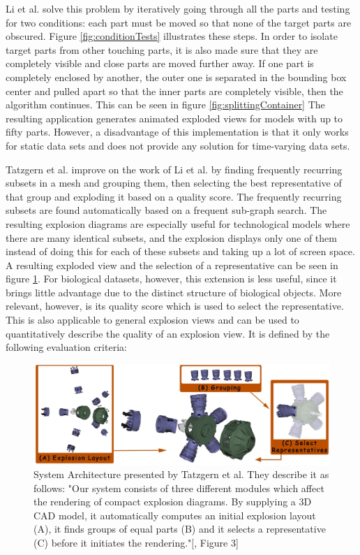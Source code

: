 Li et al. solve this problem by iteratively going through all the parts and testing for two conditions: each part must be moved so that none of the target parts are obscured. Figure \ref{fig:conditionTests} illustrates these steps.
In order to isolate target parts from other touching parts, it is also made sure that they are completely visible and close parts are moved further away. 
If one part is completely enclosed by another, the outer one is separated in the bounding box center and pulled apart so that the inner parts are completely visible, then the algorithm continues. This can be seen in figure \ref{fig:splittingContainer}
The resulting application generates animated exploded views for models with up to fifty parts. 
However, a disadvantage of this implementation is that it only works for static data sets and does not provide any solution for time-varying data sets.

Tatzgern et al. improve on the work of Li et al. by finding frequently recurring subsets in a mesh and grouping them, then selecting the best representative of that group and exploding it based on a quality score.\cite{Tatzgern_2010}
The frequently recurring subsets are found automatically based on a frequent sub-graph search.
The resulting explosion diagrams are especially useful for technological models where there are many identical subsets, and the explosion displays only one of them instead of doing this for each of these subsets and taking up a lot of screen space. 
A resulting exploded view and the selection of a representative can be seen in figure \ref{fig:tatzgern}.
For biological datasets, however, this extension is less useful, since it brings little advantage due to the distinct structure of biological objects.
More relevant, however, is its quality score which is used to select the representative. This is also applicable to general explosion views and can be used to quantitatively describe the quality of an explosion view. It is defined by the following evaluation criteria: 

\begin{figure}[t]
\centering
\includegraphics[width=.95\linewidth]{fig/Images/Tatzgern_fig3}
	\caption[]{System Architecture presented by Tatzgern et al. They describe it as follows: "Our system consists of three different modules which affect the rendering of compact explosion diagrams. By supplying a 3D CAD model, it automatically computes an initial explosion layout (A), it finds groups of equal parts (B) and it selects a representative (C) before it initiates the rendering."[\cite{Tatzgern_2010}, Figure 3]}
	\label{fig:tatzgern}
\end{figure}

